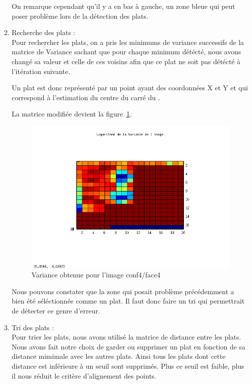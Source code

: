 \begin{enumerate}
  On remarque cependant qu'il y a en bas à gauche, un zone bleue qui peut poser problème lors de la détection des plats. 

  \item Recherche des plats : \\
 
  Pour rechercher les plats, on a pris les minimums de variance successifs de la matrice de Variance sachant que pour chaque minimum détécté, nous avons changé sa valeur et celle de ces voisins afin que ce plat ne soit pas détécté à l'itération suivante. 

  Un plat est donc représenté par un point ayant des coordonnées X et Y et qui correspond à l'estimation du centre du carré du \rubic.

 La matrice modifiée devient la figure~\ref{variance2D_VARapres}. 

\begin{figure}[!ht]
\centering
\includegraphics[width=\linewidth]{Images/Variance2D_variance_apres_2.png}
\caption{Variance obtenue pour l'image conf4/face4}
\label{variance2D_VARapres}
\end{figure}

  Nous pouvons constater que la zone qui posait problème précédemment a bien été séléctionnée comme un plat. 
Il faut donc faire un tri qui permettrait de détecter ce genre d'erreur. 

  \item Tri des plats : \\ 

  Pour trier les plats, nous avons utilisé la matrice de distance entre les plats. 
Nous avons fait notre choix de garder ou supprimer un plat en fonction de sa distance mimimale avec les autres plats. 
Ainsi tous les plats dont cette distance est inférieure à un seuil sont supprimés. 
Plus ce seuil est faible, plus il nous réduit le critère d'alignement des points. 


\end{enumerate}
